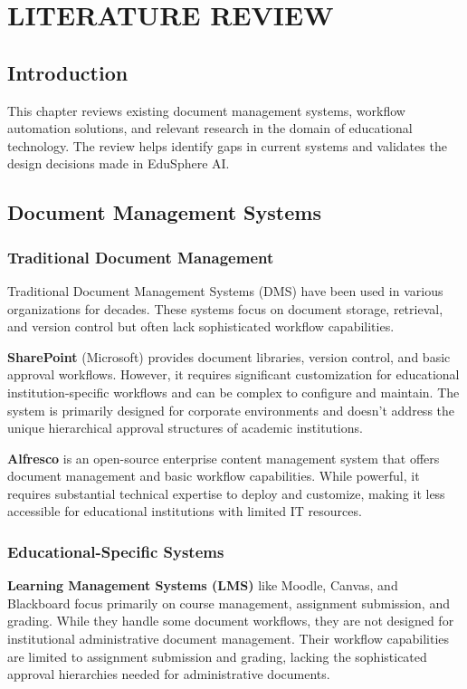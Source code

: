 \chapter{LITERATURE REVIEW}

\section{Introduction}

This chapter reviews existing document management systems, workflow automation solutions, and relevant research in the domain of educational technology. The review helps identify gaps in current systems and validates the design decisions made in EduSphere AI.

\section{Document Management Systems}

\subsection{Traditional Document Management}

Traditional Document Management Systems (DMS) have been used in various organizations for decades. These systems focus on document storage, retrieval, and version control but often lack sophisticated workflow capabilities.

\textbf{SharePoint} (Microsoft) provides document libraries, version control, and basic approval workflows. However, it requires significant customization for educational institution-specific workflows and can be complex to configure and maintain. The system is primarily designed for corporate environments and doesn't address the unique hierarchical approval structures of academic institutions.

\textbf{Alfresco} is an open-source enterprise content management system that offers document management and basic workflow capabilities. While powerful, it requires substantial technical expertise to deploy and customize, making it less accessible for educational institutions with limited IT resources.

\subsection{Educational-Specific Systems}

\textbf{Learning Management Systems (LMS)} like Moodle, Canvas, and Blackboard focus primarily on course management, assignment submission, and grading. While they handle some document workflows, they are not designed for institutional administrative document management. Their workflow capabilities are limited to assignment submission and grading, lacking the sophisticated approval hierarchies needed for administrative documents.


